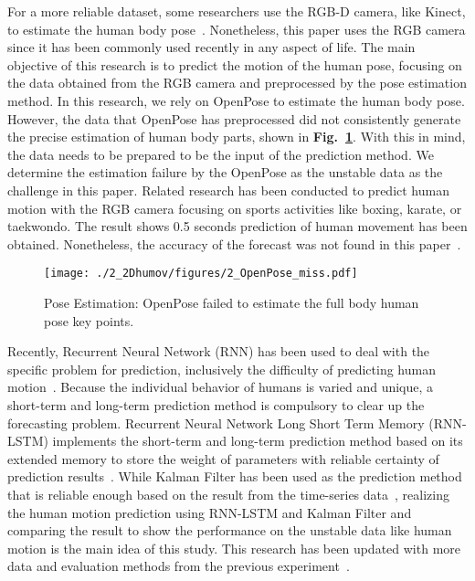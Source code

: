For a more reliable dataset, some researchers use the RGB-D camera, like Kinect, to estimate the human body pose~\cite{martinez2017, tang2018long}. Nonetheless, this paper uses the RGB camera since it has been commonly used recently in any aspect of life. The main objective of this research is to predict the motion of the
human pose, focusing on the data obtained from the RGB camera and preprocessed by the pose estimation method. In this research, we rely on OpenPose to estimate the human body pose. However, the data that OpenPose has preprocessed did not consistently generate the precise estimation of human body parts, shown in \textbf{Fig.~\ref{fig:2_openpose_miss}}. With this in mind, the data needs to be prepared to be the input of the prediction method. We determine the estimation failure by the OpenPose as the unstable data as the challenge in this paper. Related research has been conducted to predict human motion with the RGB camera focusing on sports activities like boxing, karate, or taekwondo. The result shows 0.5 seconds prediction of human movement has been obtained. Nonetheless, the accuracy of the forecast was not found in this paper~\cite{wu2018real}.

\begin{figure}
    \centering
    \texttt{[image: ./2\_2Dhumov/figures/2\_OpenPose\_miss.pdf]}
    \caption{Pose Estimation: OpenPose failed to estimate the full body human pose key points.}
    \label{fig:2_openpose_miss}
\end{figure}

Recently, Recurrent Neural Network (RNN) has been used to deal with the specific problem for prediction, inclusively the difficulty of predicting human motion~\cite{martinez2017, graves2013generating, che2018recurrent}. Because the individual behavior of humans is varied and unique, a short-term and long-term prediction method is compulsory to clear up the forecasting problem. Recurrent Neural Network Long Short Term Memory (RNN-LSTM) implements the short-term and long-term prediction method based on its extended memory to store the weight of parameters with reliable certainty of prediction results~\cite{akita2016deep, hochreiter1997long}.
While Kalman Filter has been used as the prediction method that is reliable enough based on the result from the time-series data~\cite{singh2021kalman}, realizing the human motion prediction using RNN-LSTM and Kalman Filter and comparing the result to show the performance on the unstable data like human motion is the main idea of this study. This research has been updated with more data and evaluation methods from the previous experiment~\cite{yunus2020time}.

